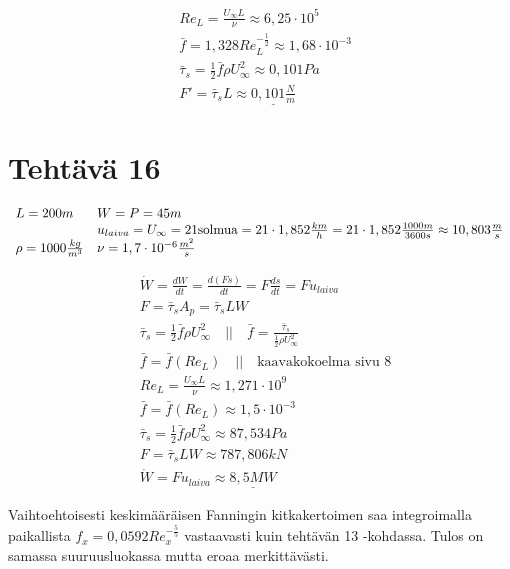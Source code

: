 \documentclass[12pt,a4paper,finnish]{article}
\begin{document}
\begin{align}
 &Re_L = \frac{U_{\infty}L}{\nu} \approx 6,25\cdot10^5\\
 &\bar{f} = 1,328Re_L^{-\frac{1}{2}} \approx 1,68\cdot10^{-3}\\
 &\bar{\tau}_s = \frac{1}{2}\bar{f}\rho U_{\infty}^2 \approx 0,101 Pa\\
 &F' = \bar{\tau}_s L \approx \underline{0,101 \frac{N}{m}}
\end{align}

\section{Tehtävä 16}

\begin{math}
 \begin{array}{l l}
  L = 200 m & W = P = 45 m\\
  &u_{laiva} = U_{\infty} = 21 \text{solmua} = 21\cdot1,852\frac{km}{h} = 21\cdot1,852\frac{1000m}{3600s} \approx 10,803\frac{m}{s}\\
  \rho = 1000 \frac{kg}{m^3} & \nu = 1,7\cdot10^{-6}\frac{m^2}{s}
 \end{array}
\end{math}

\begin{align}
 &\dot{W} = \frac{dW}{dt} = \frac{d(Fs)}{dt} = F\frac{ds}{dt} = Fu_{laiva}\\
 &F = \bar{\tau}_sA_p = \bar{\tau}_sLW\\
 &\bar{\tau}_s = \frac{1}{2}\bar{f}\rho U_{\infty}^2 
  \quad \bigg|\bigg| \quad \bar{f} = \frac{\bar{\tau}_s}{\frac{1}{2}\rho U_{\infty}^2}\\
 &\bar{f} = \bar{f}(Re_L) \quad \bigg|\bigg| \quad \text{kaavakokoelma sivu 8}\\
 &Re_L = \frac{U_{\infty}L}{\nu} \approx 1,271\cdot10^9\\
 &\bar{f} = \bar{f}(Re_L) \approx 1,5\cdot10^{-3}\\
 &\bar{\tau}_s = \frac{1}{2}\bar{f}\rho U_{\infty}^2 \approx 87,534 Pa\\
 &F = \bar{\tau}_sLW \approx 787,806 kN\\
 &\dot{W} = Fu_{laiva} \approx \underline{8,5 MW}
\end{align}

Vaihtoehtoisesti keskimääräisen Fanningin kitkakertoimen saa integroimalla paikallista 
$f_x = 0,0592Re_x^{-\frac{5}{5}}$ vastaavasti kuin tehtävän 13 -kohdassa. 
Tulos on samassa suuruusluokassa mutta eroaa merkittävästi.
\end{document}
